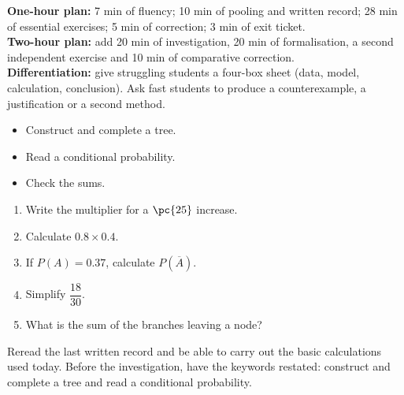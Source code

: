 \ifmxteacher
\begin{method}
\textbf{One-hour plan:} 7 min of fluency; 10 min of pooling and written record; 28 min of essential exercises; 5 min of correction; 3 min of exit ticket.\\
\textbf{Two-hour plan:} add 20 min of investigation, 20 min of formalisation, a second independent exercise and 10 min of comparative correction.\\
\textbf{Differentiation:} give struggling students a four-box sheet (data, model, calculation, conclusion). Ask fast students to produce a counterexample, a justification or a second method.
\end{method}
\fi
{}
    \begin{objectives}\begin{itemize}\item Construct and complete a tree.\item Read a conditional probability.\item Check the sums.\end{itemize}\end{objectives}
    \begin{fluency}\begin{enumerate}\item Write the multiplier for a $\pc{25}$ increase. \item Calculate $\num{0,8}\times\num{0,4}$. \item If $P(A)=\num{0,37}$, calculate $P(\overline A)$. \item Simplify $\dfrac{18}{30}$. \item What is the sum of the branches leaving a node? \end{enumerate}\end{fluency}
    \begin{prerequisites}Reread the last written record and be able to carry out the basic calculations used today. Before the investigation, have the keywords restated: construct and complete a tree and read a conditional probability.\end{prerequisites}

